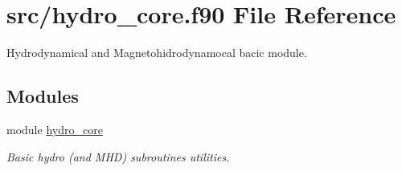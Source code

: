 \hypertarget{hydro__core_8f90}{}\section{src/hydro\+\_\+core.f90 File Reference}
\label{hydro__core_8f90}


Hydrodynamical and Magnetohidrodynamocal bacic module.  


\subsection*{Modules}
\begin{DoxyCompactItemize}
\item 
module \hyperlink{namespacehydro__core}{hydro\+\_\+core}
\begin{DoxyCompactList}\small\item\em Basic hydro (and M\+H\+D) subroutines utilities. \end{DoxyCompactList}\end{DoxyCompactItemize}
